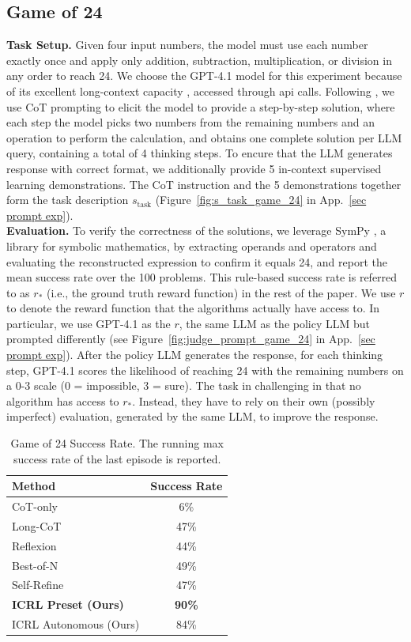 \documentclass{article}
\newcommand{\0}{\mathbf{0}}
\begin{document}
\subsection{Game of 24}
\textbf{Task Setup.} Given four input numbers, the model must use each number exactly once and apply only addition, subtraction, multiplication, or division in any order to reach 24.
We choose the GPT-4.1 model for this experiment because of its excellent long-context capacity \citep{openai2025gpt4.1}, accessed through api calls.
Following \cite{tot}, we use CoT prompting to elicit the model to provide a step-by-step solution, where each step the model picks two numbers from the remaining numbers and an operation to perform the calculation, and obtains one complete solution per LLM query, containing a total of 4 thinking steps.
To encure that the LLM generates response with correct format,
we additionally provide 5 in-context supervised learning demonstrations.
The CoT instruction and the 5 demonstrations together form the task description $s_\text{task}$ (Figure~\ref{fig:s_task_game_24} in App.~\ref{sec prompt exp}). \\
\textbf{Evaluation.} To verify the correctness of the solutions, we leverage SymPy \citep{sympy}, a library for symbolic mathematics, by extracting operands and operators and evaluating the reconstructed expression to confirm it equals 24, and report the mean success rate over the 100 problems.
This rule-based success rate is referred to as $r_*$ (i.e., the ground truth reward function) in the rest of the paper.
We use $r$ to denote the reward function that the algorithms actually have access to.
In particular,
we use GPT-4.1 as the $r$,
the same LLM as the policy LLM but prompted differently (see Figure~\ref{fig:judge_prompt_game_24} in App.~\ref{sec prompt exp}).
After the policy LLM generates the response, for each thinking step, GPT-4.1 scores the likelihood of reaching 24 with the remaining numbers on a 0-3 scale (0 = impossible, 3 = sure).
The task in challenging in that no algorithm has access to $r_*$.
Instead,
they have to rely on their own (possibly imperfect) evaluation,
generated by the same LLM,
to improve the response. \\
\begin{table}
\centering
\caption{Game of 24 Success Rate. The running max success rate of the last episode is reported.}
\begin{tabular}{lc}
\toprule
Method       & Success Rate \\
\midrule
CoT-only     & 6\%     \\
Long-CoT     & 47\%    \\
Reflexion    & 44\%    \\
Best-of-N    & 49\%    \\
Self-Refine  & 47\%    \\
\textbf{ICRL Preset (Ours)}         & \textbf{90\%}    \\
ICRL Autonomous (Ours) & 84\% \\
\bottomrule
\end{tabular}
\label{tab:game_24_success_rates}
\end{table}
\end{document}

